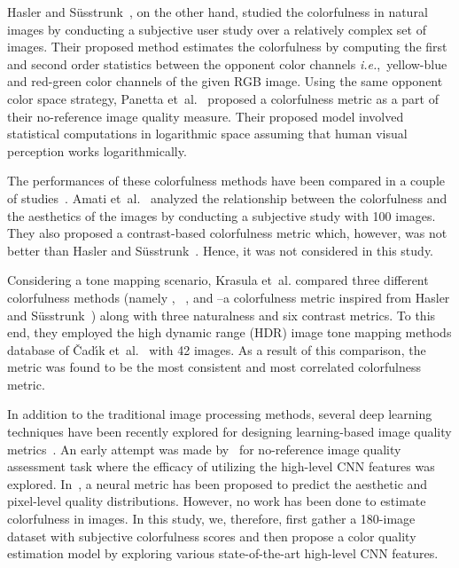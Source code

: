 \documentclass{article}
\newcommand{\ie}[0]{\textit{i.e.},~}
\begin{document}
Hasler and S\"usstrunk~\cite{hasler2003measuring}, on the other hand, studied the colorfulness in natural images by conducting a subjective user study over a relatively complex set of images. Their proposed method estimates the colorfulness by computing the first and second order statistics between the opponent color channels \ie yellow-blue and red-green color channels of the given RGB image. Using the same opponent color space strategy, Panetta et~al.~\cite{panetta2013no} proposed a colorfulness metric as a part of their no-reference image quality measure. Their proposed model involved statistical computations in logarithmic space assuming that human visual perception works logarithmically.



The performances of these colorfulness methods have been compared in a couple of studies~\cite{amati2014study, krasula2014objective}. Amati et~al.~\cite{amati2014study} analyzed the relationship between the colorfulness and the aesthetics of the images by conducting a subjective study with 100 images. They also proposed a contrast-based colorfulness metric which, however, was not better than Hasler and S\"usstrunk~\cite{hasler2003measuring}. Hence, it was not considered in this study.



Considering a tone mapping scenario, Krasula et~al.\cite{krasula2014objective} compared three different colorfulness methods (namely , ~\cite{panetta2013no}, and  --a colorfulness metric inspired from Hasler and S\"usstrunk~\cite{hasler2003measuring}) along with three naturalness and six contrast metrics. To this end, they employed the high dynamic range (HDR) image tone mapping methods database of {\v{C}}ad{\'\i}k et~al.~\cite{cadik2008evaluation} with 42 images. As a result of this comparison, the  metric was found to be the most consistent and most correlated colorfulness metric. 

In addition to the traditional image processing methods, several deep learning techniques have been recently explored for designing learning-based image quality metrics~\cite{Talebi2018NIMA, Kangcvpr}. An early attempt was made by~\cite{Kangcvpr} for no-reference image quality assessment task where the efficacy of utilizing the high-level CNN features was explored. In~\cite{Talebi2018NIMA}, a neural metric has been proposed to predict the aesthetic and pixel-level quality distributions. However, no work has been done to estimate colorfulness in images.  
In this study, we, therefore, first gather a 180-image dataset with subjective colorfulness scores and then propose a color quality estimation model by exploring various state-of-the-art high-level CNN features. 
\end{document}
